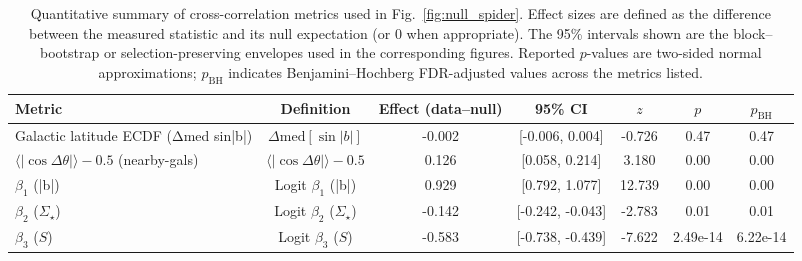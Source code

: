 \begin{table}[t]
\centering
\small
\begin{tabular}{lcccccc}
\toprule
Metric & Definition & Effect (data--null) & 95\% CI & $z$ & $p$ & $p_{\mathrm{BH}}$ \\
\midrule
Galactic latitude ECDF (Δmed sin|b|) & $\Delta\mathrm{med}[\sin|b|]$ & -0.002 & [-0.006, 0.004] & -0.726 & 0.47 & 0.47 \\
$\langle|\cos\Delta\theta|\rangle-0.5$ (nearby-gals) & $\langle|\cos\Delta\theta|\rangle-0.5$ & 0.126 & [0.058, 0.214] & 3.180 & 0.00 & 0.00 \\
$\beta_1$ (|b|) & Logit $\beta_1$ (|b|) & 0.929 & [0.792, 1.077] & 12.739 & 0.00 & 0.00 \\
$\beta_2$ ($\Sigma_\star$) & Logit $\beta_2$ ($\Sigma_\star$) & -0.142 & [-0.242, -0.043] & -2.783 & 0.01 & 0.01 \\
$\beta_3$ ($S$) & Logit $\beta_3$ ($S$) & -0.583 & [-0.738, -0.439] & -7.622 & 2.49e-14 & 6.22e-14 \\
\bottomrule
\end{tabular}
\caption{Quantitative summary of cross-correlation metrics used in Fig.~\ref{fig:null_spider}. Effect sizes are defined as the difference between the measured statistic and its null expectation (or 0 when appropriate). The 95\% intervals shown are the block--bootstrap or selection-preserving envelopes used in the corresponding figures. Reported $p$-values are two-sided normal approximations; $p_{\mathrm{BH}}$ indicates Benjamini--Hochberg FDR-adjusted values across the metrics listed.}
\label{tab:quant_summary}
\end{table}